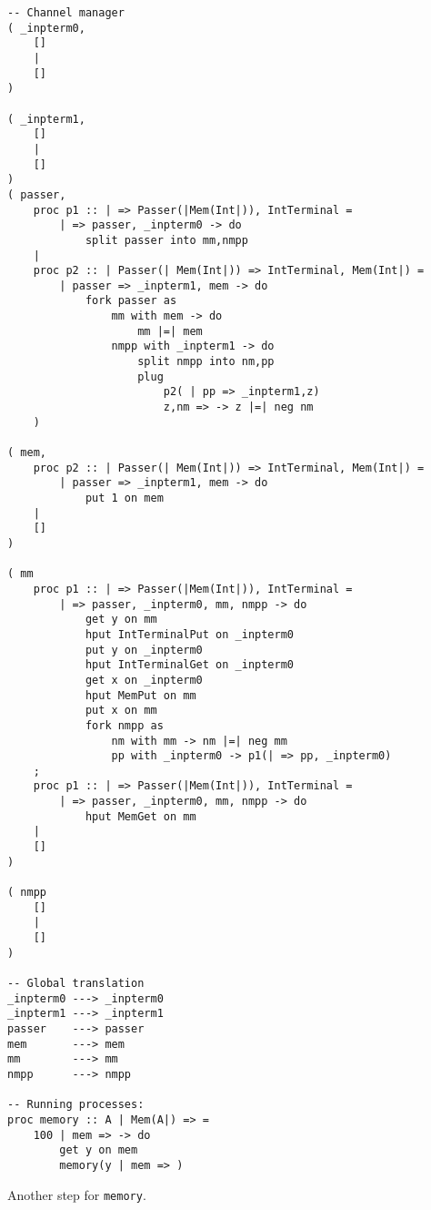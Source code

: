 \documentclass{article}
\theoremstyle{plain}%
\theoremstyle{definition}
\theoremstyle{remark}
\begin{document}
\begin{verbatim}
-- Channel manager
( _inpterm0,  
    []
    |
    []
)

( _inpterm1,  
    []
    |
    []
)
( passer,
    proc p1 :: | => Passer(|Mem(Int|)), IntTerminal = 
        | => passer, _inpterm0 -> do
            split passer into mm,nmpp 
    |
    proc p2 :: | Passer(| Mem(Int|)) => IntTerminal, Mem(Int|) =
        | passer => _inpterm1, mem -> do
            fork passer as
                mm with mem -> do
                    mm |=| mem
                nmpp with _inpterm1 -> do
                    split nmpp into nm,pp
                    plug
                        p2( | pp => _inpterm1,z)
                        z,nm => -> z |=| neg nm
    )

( mem,
    proc p2 :: | Passer(| Mem(Int|)) => IntTerminal, Mem(Int|) =
        | passer => _inpterm1, mem -> do
            put 1 on mem
    |
    []
)

( mm
    proc p1 :: | => Passer(|Mem(Int|)), IntTerminal = 
        | => passer, _inpterm0, mm, nmpp -> do
            get y on mm
            hput IntTerminalPut on _inpterm0
            put y on _inpterm0
            hput IntTerminalGet on _inpterm0
            get x on _inpterm0
            hput MemPut on mm
            put x on mm
            fork nmpp as
                nm with mm -> nm |=| neg mm
                pp with _inpterm0 -> p1(| => pp, _inpterm0)
    ;
    proc p1 :: | => Passer(|Mem(Int|)), IntTerminal = 
        | => passer, _inpterm0, mm, nmpp -> do
            hput MemGet on mm 
    |
    []
)

( nmpp
    []
    |
    []
)

-- Global translation
_inpterm0 ---> _inpterm0 
_inpterm1 ---> _inpterm1 
passer    ---> passer 
mem       ---> mem
mm        ---> mm
nmpp      ---> nmpp

-- Running processes:
proc memory :: A | Mem(A|) => =
    100 | mem => -> do
        get y on mem
        memory(y | mem => )
\end{verbatim}

Another step for \verb|memory|.
\end{document}
